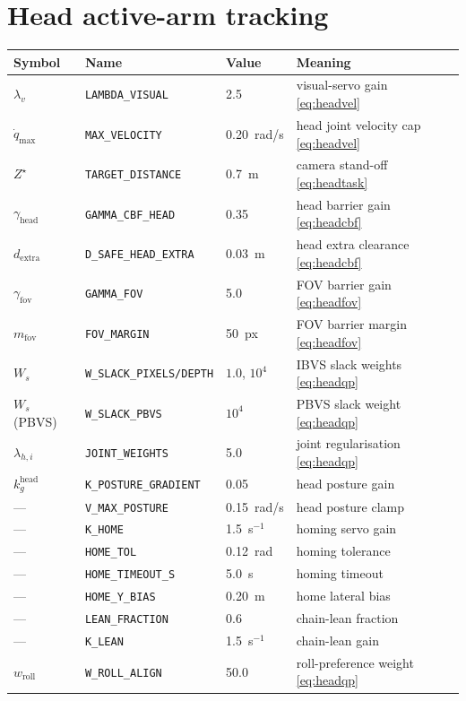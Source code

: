 \documentclass[12pt,a4paper,twoside,openright]{report}
\newcommand{\qdot}{\dot{q}}
\begin{document}
\section{Head active-arm tracking}
\begin{tabularx}{\linewidth}{@{}lllX@{}}
\toprule
Symbol & Name & Value & Meaning \\
\midrule
$\lambda_v$ & \texttt{LAMBDA\_VISUAL} & 2.5 & visual-servo gain \eqref{eq:headvel} \\
$\qdot_{\max}$ & \texttt{MAX\_VELOCITY} & 0.20~rad/s & head joint velocity cap \eqref{eq:headvel} \\
$Z^{\star}$ & \texttt{TARGET\_DISTANCE} & 0.7~m & camera stand-off \eqref{eq:headtask} \\
$\gamma_{\text{head}}$ & \texttt{GAMMA\_CBF\_HEAD} & 0.35 & head barrier gain \eqref{eq:headcbf} \\
$d_{\text{extra}}$ & \texttt{D\_SAFE\_HEAD\_EXTRA} & 0.03~m & head extra clearance \eqref{eq:headcbf} \\
$\gamma_{\text{fov}}$ & \texttt{GAMMA\_FOV} & 5.0 & FOV barrier gain \eqref{eq:headfov} \\
$m_{\text{fov}}$ & \texttt{FOV\_MARGIN} & 50~px & FOV barrier margin \eqref{eq:headfov} \\
$W_s$ & \texttt{W\_SLACK\_PIXELS/DEPTH} & $1.0$, $10^{4}$ & IBVS slack weights \eqref{eq:headqp} \\
$W_s$ (PBVS) & \texttt{W\_SLACK\_PBVS} & $10^{4}$ & PBVS slack weight \eqref{eq:headqp} \\
$\lambda_{h,i}$ & \texttt{JOINT\_WEIGHTS} & 5.0 & joint regularisation \eqref{eq:headqp} \\
$k_g^{\text{head}}$ & \texttt{K\_POSTURE\_GRADIENT} & 0.05 & head posture gain \\
--- & \texttt{V\_MAX\_POSTURE} & 0.15~rad/s & head posture clamp \\
--- & \texttt{K\_HOME} & 1.5~s$^{-1}$ & homing servo gain \\
--- & \texttt{HOME\_TOL} & 0.12~rad & homing tolerance \\
--- & \texttt{HOME\_TIMEOUT\_S} & 5.0~s & homing timeout \\
--- & \texttt{HOME\_Y\_BIAS} & 0.20~m & home lateral bias \\
--- & \texttt{LEAN\_FRACTION} & 0.6 & chain-lean fraction \\
--- & \texttt{K\_LEAN} & 1.5~s$^{-1}$ & chain-lean gain \\
$w_{\text{roll}}$ & \texttt{W\_ROLL\_ALIGN} & 50.0 & roll-preference weight \eqref{eq:headqp} \\

\end{tabularx}
\end{document}
